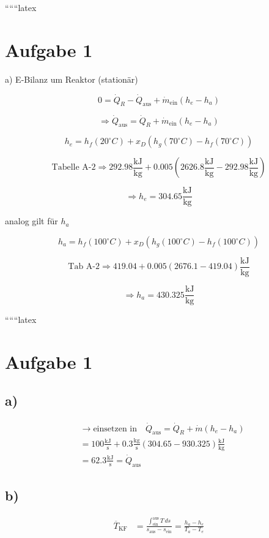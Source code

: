 
``````latex


\section*{Aufgabe 1}

a) E-Bilanz um Reaktor (stationär)

\[
0 = \dot{Q}_R - \dot{Q}_{\text{aus}} + \dot{m}_{\text{ein}} (h_e - h_a)
\]

\[
\Rightarrow \dot{Q}_{\text{aus}} = \dot{Q}_R + \dot{m}_{\text{ein}} (h_e - h_a)
\]

\[
h_e = h_f (20^\circ C) + x_D (h_g (70^\circ C) - h_f (70^\circ C))
\]

\[
\text{Tabelle A-2} \Rightarrow 292.98 \frac{\text{kJ}}{\text{kg}} + 0.005 (2626.8 \frac{\text{kJ}}{\text{kg}} - 292.98 \frac{\text{kJ}}{\text{kg}})
\]

\[
\Rightarrow h_e = 304.65 \frac{\text{kJ}}{\text{kg}}
\]

analog gilt für $h_a$

\[
h_a = h_f (100^\circ C) + x_D (h_g (100^\circ C) - h_f (100^\circ C))
\]

\[
\text{Tab A-2} \Rightarrow 419.04 + 0.005 (2676.1 - 419.04) \frac{\text{kJ}}{\text{kg}}
\]

\[
\Rightarrow h_a = 430.325 \frac{\text{kJ}}{\text{kg}}
\]

``````latex


\section*{Aufgabe 1}

\subsection*{a)}
\begin{align*}
&\rightarrow \text{einsetzen in} \quad \dot{Q}_{\text{aus}} = \dot{Q}_R + \dot{m} (h_e - h_a) \\
&= 100 \frac{\text{kJ}}{\text{s}} + 0.3 \frac{\text{kg}}{\text{s}} \left( 304.65 - 930.325 \right) \frac{\text{kJ}}{\text{kg}} \\
&= 62.3 \frac{\text{kJ}}{\text{s}} = \dot{Q}_{\text{aus}}
\end{align*}

\subsection*{b)}
\begin{align*}
\overline{T}_{\text{KF}} &= \frac{\int_{\text{ein}}^{\text{aus}} T \, ds}{s_{\text{aus}} - s_{\text{ein}}} = \frac{h_a - h_e}{T_a - T_e}
\end{align*}

